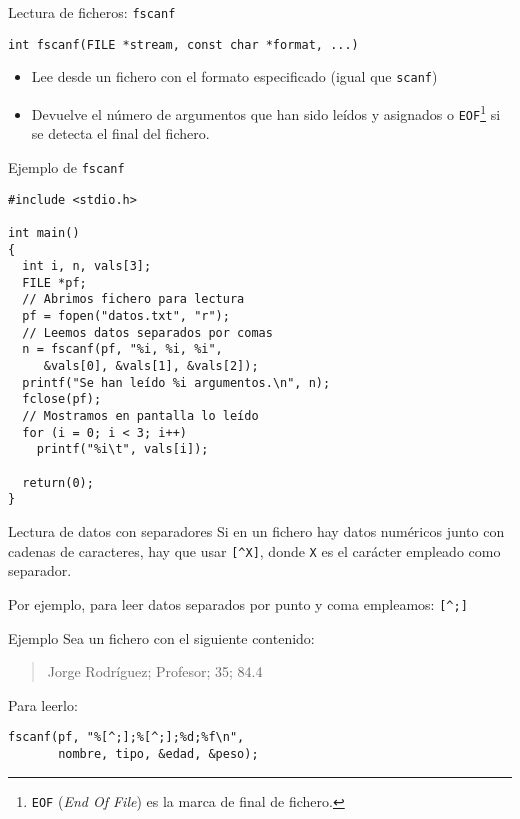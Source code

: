 \documentclass[xcolor={usenames,svgnames,dvipsnames}, aspectratio=169]{beamer}
\begin{document}
\begin{frame}[label={sec:org1357c97},fragile]{Lectura de ficheros: \texttt{fscanf}}
 \lstset{language=C,label= ,caption= ,captionpos=b,numbers=none}
\begin{lstlisting}
int fscanf(FILE *stream, const char *format, ...)
\end{lstlisting}

\begin{itemize}
\item Lee desde un fichero con el formato especificado (\alert{igual que \texttt{scanf}})

\item Devuelve el número de argumentos que han sido leídos y asignados o \texttt{EOF}\footnote{\texttt{EOF} (\emph{End Of File}) es la marca de final de fichero.} si se detecta el final del fichero.
\end{itemize}
\end{frame}


\begin{frame}[label={sec:orgc15ffbe},fragile,plain]{Ejemplo de \texttt{fscanf}}
 \lstset{language=C,label= ,caption= ,captionpos=b,numbers=none}
\begin{lstlisting}
#include <stdio.h>

int main()
{
  int i, n, vals[3];
  FILE *pf;
  // Abrimos fichero para lectura
  pf = fopen("datos.txt", "r");
  // Leemos datos separados por comas
  n = fscanf(pf, "%i, %i, %i",
	 &vals[0], &vals[1], &vals[2]);
  printf("Se han leído %i argumentos.\n", n);
  fclose(pf);
  // Mostramos en pantalla lo leído
  for (i = 0; i < 3; i++)
    printf("%i\t", vals[i]);

  return(0);
}
\end{lstlisting}
\end{frame}



\begin{frame}[label={sec:orgefc144a},fragile]{Lectura de datos con separadores}
 Si en un fichero hay datos numéricos junto con cadenas de caracteres, hay que usar \texttt{[\textasciicircum{}X]}, donde \texttt{X} es el carácter empleado como separador. 

Por ejemplo, para leer datos separados por punto y coma empleamos: \texttt{[\textasciicircum{};]}

\begin{block}{Ejemplo}
Sea un fichero con el siguiente contenido:
\begin{quote}
Jorge Rodríguez; Profesor; 35; 84.4
\end{quote}

Para leerlo:
\lstset{language=C,label= ,caption= ,captionpos=b,numbers=none}
\begin{lstlisting}
fscanf(pf, "%[^;];%[^;];%d;%f\n",
       nombre, tipo, &edad, &peso);
\end{lstlisting}
\end{block}
\end{frame}
\end{document}
